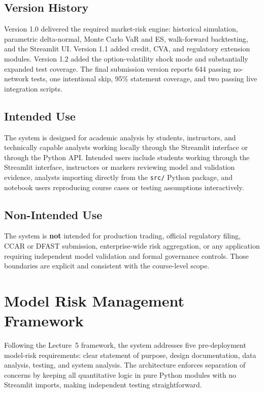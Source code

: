 \documentclass[11pt]{article}
\newcommand{\code}[1]{\texttt{#1}}
\begin{document}
\subsection{Version History}

Version 1.0 delivered the required market-risk engine: historical
simulation, parametric delta-normal, Monte Carlo VaR and ES, walk-forward
backtesting, and the Streamlit UI.  Version 1.1 added credit, CVA, and
regulatory extension modules.  Version 1.2 added the option-volatility
shock mode and substantially expanded test coverage.  The final
submission version reports 644 passing no-network tests, one intentional
skip, 95\% statement coverage, and two passing live integration scripts.

\subsection{Intended Use}

The system is designed for academic analysis by students, instructors,
and technically capable analysts working locally through the Streamlit
interface or through the Python API.  Intended users include students
working through the Streamlit interface, instructors or markers reviewing
model and validation evidence, analysts importing directly from the
\code{src/} Python package, and notebook users reproducing course cases
or testing assumptions interactively.

\subsection{Non-Intended Use}

The system is \textbf{not} intended for production trading, official
regulatory filing, CCAR or DFAST submission, enterprise-wide risk
aggregation, or any application requiring independent model validation
and formal governance controls.  Those boundaries are explicit and
consistent with the course-level scope.

\section{Model Risk Management Framework}
\label{sec:mrm-framework}

Following the Lecture~5 framework, the system addresses five
pre-deployment model-risk requirements: clear statement of purpose,
design documentation, data analysis, testing, and system analysis.  The
architecture enforces separation of concerns by keeping all quantitative
logic in pure Python modules with no Streamlit imports, making independent
testing straightforward.
\end{document}
